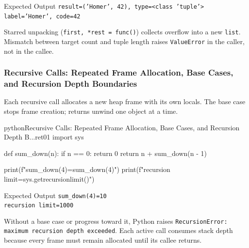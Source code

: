 \begin{iobox}{Expected Output}
\texttt{result=('Homer', 42), type=<class 'tuple'>} \\
\texttt{label='Homer', code=42} \\
\end{iobox}




Starred unpacking (\texttt{first, *rest = func()}) collects overflow into a new \texttt{list}. Mismatch between target count and tuple length raises \texttt{ValueError} in the caller, not in the callee.

\subsubsection{Recursive Calls: Repeated Frame Allocation, Base Cases, and Recursion Depth Boundaries}

Each recursive call allocates a new heap frame with its own locals. The base case stops frame creation; returns unwind one object at a time.

\begin{codebox}[]{python}{Recursive Calls: Repeated Frame Allocation, Base Cases, and Recursion Depth B...}{ret01}
import sys

def sum_down(n):
    if n == 0:
        return 0
    return n + sum_down(n - 1)

print(f"sum_down(4)={sum_down(4)}")
print(f"recursion limit={sys.getrecursionlimit()}")
\end{codebox}


\begin{iobox}{Expected Output}
\texttt{sum\_down(4)=10} \\
\texttt{recursion limit=1000} \\
\end{iobox}




Without a base case or progress toward it, Python raises \texttt{RecursionError: maximum recursion depth exceeded}. Each active call consumes stack depth because every frame must remain allocated until its callee returns.
